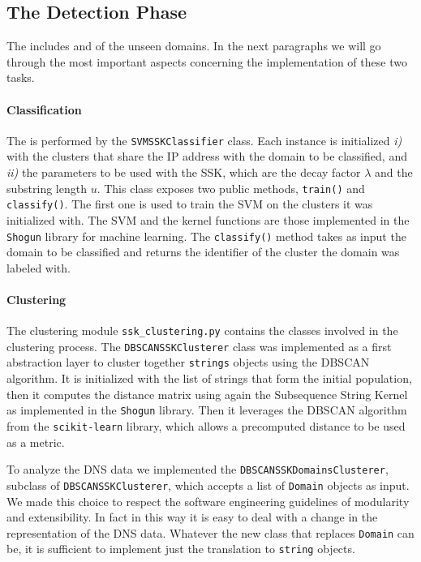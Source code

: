 \subsection{The Detection Phase} %
\label{sub:the_detection_phase}
The  includes 
and  of the unseen domains. In the next paragraphs we will
go through the most important aspects concerning the implementation of these two
tasks.

\paragraph{Classification} %
\label{par:svmsskclassifier}
The  is performed by the \texttt{SVMSSKClassifier} class.
Each instance is initialized \emph{i)} with the clusters that
share the IP address with the domain to be classified, and \emph{ii)} the parameters
to be used with the SSK, which are the decay factor
$\lambda$ and the substring length $u$. This class exposes two public methods,
\texttt{train()} and \texttt{classify()}. The first one is used to train the
SVM on the clusters it was initialized with. The SVM and the kernel functions
are those implemented in the \texttt{Shogun} library for machine learning.
The \texttt{classify()} method takes as input the domain to be classified and
returns the identifier of the cluster the domain was labeled with.

\paragraph{Clustering} %
\label{par:clustering}
The clustering module \texttt{ssk\_clustering.py} contains the classes involved
in the clustering process. The \texttt{DBSCANSSKClusterer} class was implemented
as a first abstraction layer to cluster together \texttt{strings} objects using
the DBSCAN algorithm. It is initialized with the list of strings that form the
initial population, then it computes the distance matrix using again the
Subsequence String Kernel as implemented in the \texttt{Shogun} library. Then
it leverages the DBSCAN algorithm from the \texttt{scikit-learn} library,
which allows a precomputed distance to be used as a metric.

To analyze the DNS data we implemented the \texttt{DBSCANSSKDomainsClusterer}, subclass of \texttt{DBSCANSSKClusterer},
which accepts a list of \texttt{Domain} objects as input. We made this choice
to respect the software engineering guidelines of modularity and extensibility. In fact in this way it is easy to deal with a change in the representation of the DNS
data. Whatever the new class that replaces \texttt{Domain} can be, it is
sufficient to implement just the translation to \texttt{string} objects.


